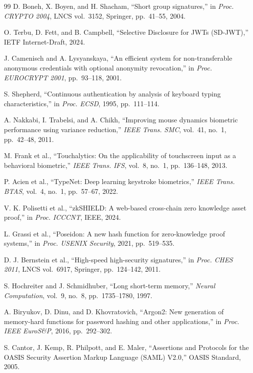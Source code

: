 \documentclass[12pt,a4paper,oneside]{report}
\begin{document}
\begin{thebibliography}{99}
D. Boneh, X. Boyen, and H. Shacham, ``Short group signatures,'' in
\textit{Proc. CRYPTO 2004}, LNCS vol.~3152, Springer, pp.~41--55, 2004.

O. Terbu, D. Fett, and B. Campbell, ``Selective Disclosure for JWTs (SD-JWT),''
IETF Internet-Draft, 2024.

J. Camenisch and A. Lysyanskaya, ``An efficient system for non-transferable anonymous
credentials with optional anonymity revocation,'' in \textit{Proc. EUROCRYPT 2001},
pp.~93--118, 2001.

S. Shepherd, ``Continuous authentication by analysis of keyboard typing
characteristics,'' in \textit{Proc. ECSD}, 1995, pp.~111--114.

A. Nakkabi, I. Trabelsi, and A. Chikh, ``Improving mouse dynamics biometric
performance using variance reduction,'' \textit{IEEE Trans. SMC}, vol.~41, no.~1,
pp.~42--48, 2011.

M. Frank et al., ``Touchalytics: On the applicability of touchscreen input as a
behavioral biometric,'' \textit{IEEE Trans. IFS}, vol.~8, no.~1, pp.~136--148, 2013.

P. Acien et al., ``TypeNet: Deep learning keystroke biometrics,''
\textit{IEEE Trans. BTAS}, vol.~4, no.~1, pp.~57--67, 2022.

V. K. Polisetti et al., ``zkSHIELD: A web-based cross-chain zero knowledge asset
proof,'' in \textit{Proc. ICCCNT}, IEEE, 2024.

L. Grassi et al., ``Poseidon: A new hash function for zero-knowledge proof systems,''
in \textit{Proc. USENIX Security}, 2021, pp.~519--535.

D. J. Bernstein et al., ``High-speed high-security signatures,'' in \textit{Proc.
CHES 2011}, LNCS vol.~6917, Springer, pp.~124--142, 2011.

S. Hochreiter and J. Schmidhuber, ``Long short-term memory,''
\textit{Neural Computation}, vol.~9, no.~8, pp.~1735--1780, 1997.

A. Biryukov, D. Dinu, and D. Khovratovich, ``Argon2: New generation of memory-hard
functions for password hashing and other applications,'' in \textit{Proc. IEEE
EuroS\&P}, 2016, pp.~292--302.

S. Cantor, J. Kemp, R. Philpott, and E. Maler, ``Assertions and Protocols for
the OASIS Security Assertion Markup Language (SAML) V2.0,'' OASIS Standard, 2005.


\end{thebibliography}
\end{document}
